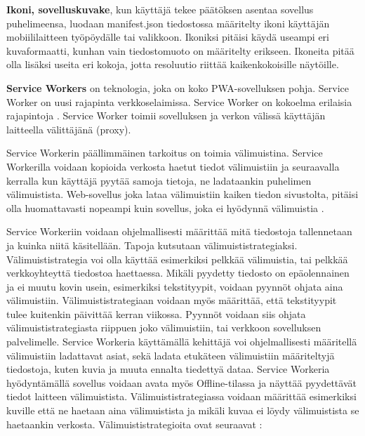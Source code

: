 \documentclass{tktltiki}
\begin{document}
\textbf{Ikoni, sovelluskuvake}, kun käyttäjä tekee päätöksen asentaa sovellus puhelimeensa, luodaan manifest.json tiedostossa määritelty ikoni käyttäjän mobiililaitteen työpöydälle tai valikkoon. Ikoniksi pitäisi käydä useampi eri kuvaformaatti, kunhan vain tiedostomuoto on määritelty erikseen. Ikoneita pitää olla lisäksi useita eri kokoja, jotta resoluutio riittää kaikenkokoisille näytöille.

\clearpage

\textbf{Service Workers} on teknologia, joka on koko PWA-sovelluksen pohja. Service Worker on uusi rajapinta verkkoselaimissa. Service Worker on kokoelma erilaisia rajapintoja \cite{malavolta2017assessing}. Service Worker toimii sovelluksen ja verkon välissä käyttäjän laitteella välittäjänä (proxy).

Service Workerin päällimmäinen tarkoitus on toimia välimuistina. Service Workerilla voidaan kopioida verkosta haetut tiedot välimuistiin ja seuraavalla kerralla kun käyttäjä pyytää samoja tietoja, ne ladataankin puhelimen välimuistista. Web-sovellus joka lataa välimuistiin kaiken tiedon sivustolta, pitäisi olla huomattavasti nopeampi kuin sovellus, joka ei hyödynnä välimuistia \cite{Walton}.

Service Workeriin voidaan ohjelmallisesti määrittää mitä tiedostoja tallennetaan ja kuinka niitä käsitellään. Tapoja kutsutaan välimuististrategiaksi. Välimuististrategia voi olla käyttää esimerkiksi pelkkää välimuistia, tai pelkkää verkkoyhteyttä tiedostoa haettaessa. Mikäli pyydetty tiedosto on epäolennainen ja ei muutu kovin usein, esimerkiksi tekstityypit, voidaan pyynnöt ohjata aina välimuistiin. Välimuististrategiaan voidaan myös määrittää, että tekstityypit tulee kuitenkin päivittää kerran viikossa. Pyynnöt voidaan siis ohjata välimuististrategiasta riippuen joko välimuistiin, tai verkkoon sovelluksen palvelimelle. Service Workeria käyttämällä kehittäjä voi ohjelmallisesti määritellä välimuistiin ladattavat asiat, sekä ladata etukäteen välimuistiin määriteltyjä tiedostoja, kuten kuvia ja muuta ennalta tiedettyä dataa.  Service Workeria hyödyntämällä sovellus voidaan avata myös Offline-tilassa ja näyttää pyydettävät tiedot laitteen välimuistista. Välimuististrategiassa voidaan määrittää esimerkiksi kuville että ne haetaan aina välimuistista ja mikäli kuvaa ei löydy välimuistista se haetaankin verkosta. Välimuististrategioita ovat seuraavat \cite{Google5}:
\end{document}

